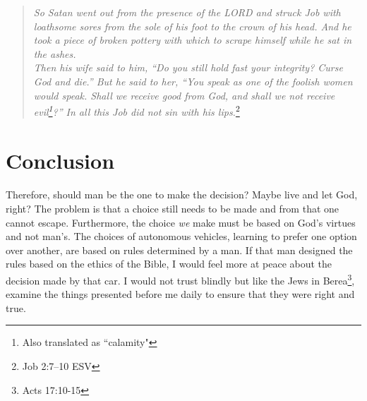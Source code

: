 \documentclass[10pt]{article}
\begin{document}
{\small \begin{quote}
	\centering
	\textit{
		So Satan went out from the presence of the LORD and struck Job with loathsome sores from the sole of his foot to the crown of his head. And he took a piece of broken pottery with which to scrape himself while he sat in the ashes.\\
		Then his wife said to him, “Do you still hold fast your integrity? Curse God and die.” But he said to her, “You speak as one of the foolish women would speak. Shall we receive good from God, and shall we not receive evil\footnote{Also translated as ``calamity"}?” In all this Job did not sin with his lips.}\footnote{Job 2:7–10 ESV}
\end{quote}}
\section{Conclusion}
\paragraph{}
Therefore, should man be the one to make the decision? Maybe live and let God, right? The problem is that a choice still needs to be made and from that one cannot escape. Furthermore, the choice \textit{we} make must be based on God's virtues and not man's. The choices of autonomous vehicles, learning to prefer one option over another, are based on rules determined by a man. If that man designed the rules based on the ethics of the Bible, I would feel more at peace about the decision made by that car. I would not trust blindly but like the Jews in Berea\footnote{Acts 17:10-15}, examine the things presented before me daily to ensure that they were right and true.

\newpage
{}	
{}


\end{document}
